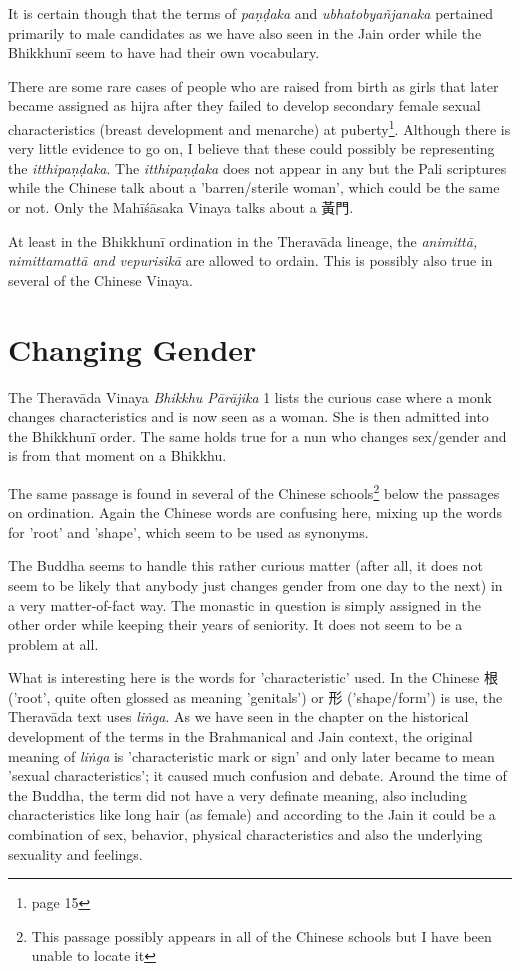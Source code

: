 It is certain though that the terms of {\em paṇḍaka} and {\em ubhatob­yañ­janaka} pertained primarily to male candidates as we have also seen in the Jain order while the Bhikkhunī seem to have had their own vocabulary.

There are some rare cases of people who are raised from birth as girls that later became assigned as hijra after they failed to develop secondary female sexual characteristics (breast development and menarche) at puberty\footnote{\cite{nanda} page 15}. Although there is very little evidence to go on, I believe that these could possibly be representing the {\em itthipaṇḍaka}. The {\em itthipaṇḍaka} does not appear in any but the Pali scriptures while the Chinese talk about a 'barren/sterile woman', which could be the same or not. Only the Mahīśāsaka Vinaya talks about a 黃門.

At least in the Bhikkhunī ordination in the Theravāda lineage, the {\em animittā, nimittamattā and vepurisikā} are allowed to ordain. This is possibly also true in several of the Chinese Vinaya.

\section{Changing Gender}

The Theravāda Vinaya {\em Bhikkhu Pā­rāji­ka} 1 lists the curious case where a monk changes characteristics and is now seen as a woman. She is then admitted into the Bhikkhunī order. The same holds true for a nun who changes sex/gender and is from that moment on a Bhikkhu.

The same passage is found in several of the Chinese schools\footnote{This passage possibly appears in all of the Chinese schools but I have been unable to locate it} below the passages on ordination. Again the Chinese words are confusing here, mixing up the words for 'root' and 'shape', which seem to be used as synonyms.

The Buddha seems to handle this rather curious matter (after all, it does not seem to be likely that anybody just changes gender from one day to the next) in a very matter-of-fact way. The monastic in question is simply assigned in the other order while keeping their years of seniority. It does not seem to be a problem at all.

What is interesting here is the words for 'characteristic' used. In the Chinese 根 ('root', quite often glossed as meaning 'genitals') or 形 ('shape/form') is use, the Theravāda text uses {\em liṅga}. As we have seen in the chapter on the historical development of the terms in the Brahmanical and Jain context, the original meaning of {\em liṅga} is 'characteristic mark or sign' and only later became to mean 'sexual characteristics'; it caused much confusion and debate. Around the time of the Buddha, the term did not have a very definate meaning, also including characteristics like long hair (as female) and according to the Jain it could be a combination of sex, behavior, physical characteristics and also the underlying sexuality and feelings. 


